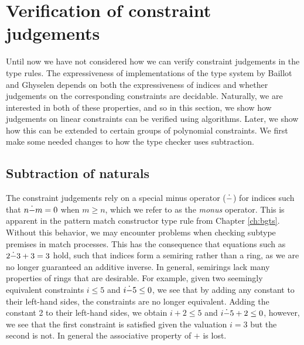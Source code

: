 \section{Verification of constraint judgements}\label{sec:verifyinglinearjudgements}
Until now we have not considered how we can verify constraint judgements in the type rules. The expressiveness of implementations of the type system by Baillot and Ghyselen \cite{BaillotGhyselen2021} depends on both the expressiveness of indices and whether judgements on the corresponding constraints are decidable. Naturally, we are interested in both of these properties, and so in this section, we show how judgements on linear constraints can be verified using algorithms. Later, we show how this can be extended to certain groups of polynomial constraints. We first make some needed changes to how the type checker uses subtraction.
%
\subsection{Subtraction of naturals}
The constraint judgements rely on a special minus operator ($\dot -$) for indices such that $n \dot - m=0$ when $m \geq n$, which we refer to as the \textit{monus} operator. This is apparent in the pattern match constructor type rule from Chapter \ref{ch:bgts}. Without this behavior, we may encounter problems when checking subtype premises in match processes. This has the consequence that equations such as $2\dot - 3+3=3$ hold, such that indices form a semiring rather than a ring, as we are no longer guaranteed an additive inverse. In general, semirings lack many properties of rings that are desirable. For example, given two seemingly equivalent constraints $i \leq 5$ and $i \dot - 5 \leq 0$, we see that by adding any constant to their left-hand sides, the constraints are no longer equivalent. Adding the constant 2 to their left-hand sides, we obtain $i + 2 \leq 5$ and $i \dot - 5 + 2 \leq 0$, however, we see that the first constraint is satisfied given the valuation $i = 3$ but the second is not. In general the associative property of $+$ is lost.\\

